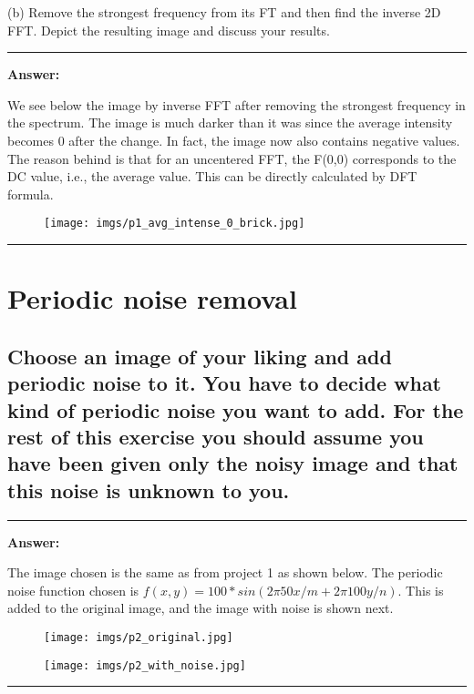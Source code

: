 \documentclass[conference]{styles/acmsiggraph}
\newenvironment{answer}{}{}
\begin{document}
(b) Remove the strongest frequency from its FT and then find the inverse 2D FFT. Depict the
resulting image and discuss your results.

\begin{answer}
	\rule{\textwidth}{0.4pt}
	\textbf{Answer:}

	We see below the image by inverse FFT after removing the strongest frequency in the spectrum. The image is much darker than it was since the average intensity becomes 0 after the change. In fact, the image now also contains negative values. The reason behind is that for an uncentered FFT, the F(0,0) corresponds to the DC value, i.e., the average value. This can be directly calculated by DFT formula. 
	\begin{figure}[H]
		\centering
		\texttt{[image: imgs/p1\_avg\_intense\_0\_brick.jpg]}
		\end{figure}	
	\rule{\textwidth}{0.4pt}
\end{answer}

\section{Periodic noise removal}
\subsection{Choose an image of your liking and add periodic noise to it. You have to decide what kind of
periodic noise you want to add. For the rest of this exercise you should assume you have been
given only the noisy image and that this noise is unknown to you.}
\begin{answer}
	\rule{\textwidth}{0.4pt}
	\textbf{Answer:}	
	
	The image chosen is the same as from project 1 as shown below. The periodic noise function chosen is $f(x,y) = 100*sin(2\pi 50 x/m + 2 \pi 100 y/n)$. This is added to the original image, and the image with noise is shown next.
	\begin{figure}[H]
	\centering
	\texttt{[image: imgs/p2\_original.jpg]}
	\end{figure}	
	\begin{figure}[H]
	\centering
	\texttt{[image: imgs/p2\_with\_noise.jpg]}
	\end{figure}	

	\rule{\textwidth}{0.4pt}
\end{answer}
\end{document}
